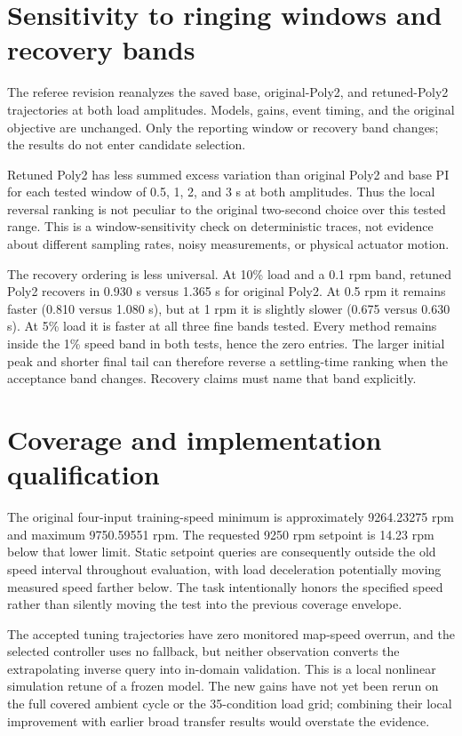\section{Sensitivity to ringing windows and recovery bands}
\label{sec:sensitivity}
The referee revision reanalyzes the saved base, original-Poly2, and retuned-Poly2 trajectories at both load amplitudes. Models, gains, event timing, and the original objective are unchanged. Only the reporting window or recovery band changes; the results do not enter candidate selection.

Retuned Poly2 has less summed excess variation than original Poly2 and base PI for each tested window of 0.5, 1, 2, and 3 s at both amplitudes. Thus the local reversal ranking is not peculiar to the original two-second choice over this tested range. This is a window-sensitivity check on deterministic traces, not evidence about different sampling rates, noisy measurements, or physical actuator motion.

The recovery ordering is less universal. At 10\% load and a 0.1 rpm band, retuned Poly2 recovers in 0.930 s versus 1.365 s for original Poly2. At 0.5 rpm it remains faster (0.810 versus 1.080 s), but at 1 rpm it is slightly slower (0.675 versus 0.630 s). At 5\% load it is faster at all three fine bands tested. Every method remains inside the 1\% speed band in both tests, hence the zero entries. The larger initial peak and shorter final tail can therefore reverse a settling-time ranking when the acceptance band changes. Recovery claims must name that band explicitly.

\section{Coverage and implementation qualification}
The original four-input training-speed minimum is approximately 9264.23275 rpm and maximum 9750.59551 rpm. The requested 9250 rpm setpoint is 14.23 rpm below that lower limit. Static setpoint queries are consequently outside the old speed interval throughout evaluation, with load deceleration potentially moving measured speed farther below. The task intentionally honors the specified speed rather than silently moving the test into the previous coverage envelope.

The accepted tuning trajectories have zero monitored map-speed overrun, and the selected controller uses no fallback, but neither observation converts the extrapolating inverse query into in-domain validation. This is a local nonlinear simulation retune of a frozen model. The new gains have not yet been rerun on the full covered ambient cycle or the 35-condition load grid; combining their local improvement with earlier broad transfer results would overstate the evidence.

